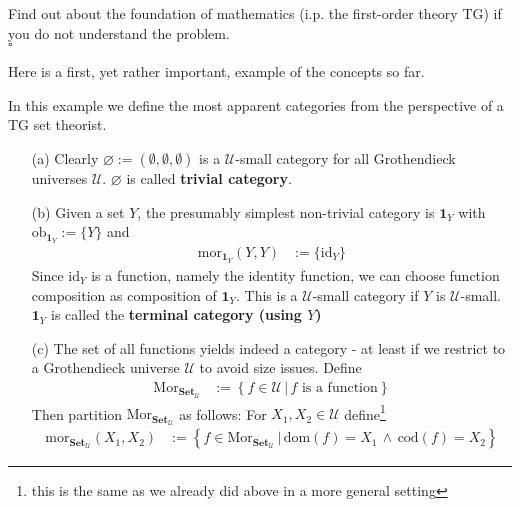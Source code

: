 \begin{prf}
Find out about the foundation of mathematics (i.p. the first-order theory TG) if you do not understand the problem.
\\
\phantom{proven}
\hfill
$\square$
\end{prf}
Here is a first, yet rather important, example of the concepts so far.
\\
\begin{exa}
\label{exa:basiccats1}
In this example we define the most apparent categories from the perspective of a TG set theorist.
\begin{enumerate}
\item[(a)]
Clearly $\mathbf{\varnothing} := (\emptyset,\emptyset,\emptyset)$ is a $\mathcal{U}$-small category for all Grothendieck universes $\mathcal{U}$. $\mathbf{\varnothing}$ is called \textbf{trivial category}.
\item[(b)]
Given a set $Y$, the presumably simplest non-trivial category is $\mathbf{1}_{Y}$ with $\mathrm{ob}_{\mathbf{1}_{Y}} := \lbrace Y \rbrace$ and
\begin{align*}
  \mathrm{mor}_{\mathbf{1}_{Y}}(Y,Y)
  &:=
  \lbrace
    \mathrm{id}_{Y}
  \rbrace
\end{align*}
Since $\mathrm{id}_{Y}$ is a function, namely the identity function, we can choose function composition as composition of $\mathbf{1}_{Y}$. This is a $\mathcal{U}$-small category if $Y$ is $\mathcal{U}$-small. $\mathbf{1}_{Y}$ is called the \textbf{terminal category (using $Y$)}
\item[(c)]
The set of all functions yields indeed a category - at least if we restrict to a Grothendieck universe $\mathcal{U}$ to avoid size issues. Define
\begin{align*}
  \mathrm{Mor}_{\mathbf{Set}_{\mathcal{U}}}
  &:=
  \left\lbrace
      f
      \in
      \mathcal{U}
    \,
    \vert
    \,
      f
      \text{ is a function}
  \right\rbrace
\end{align*}
Then partition $\mathrm{Mor}_{\mathbf{Set}_{\mathcal{U}}}$ as follows: For $X_{1},X_{2} \in \mathcal{U}$ define\footnote{this is the same as we already did above in a more general setting}
\begin{align*}
  \mathrm{mor}_{\mathbf{Set}_{\mathcal{U}}}(X_{1},X_{2})
  &:=
  \left\lbrace
      f
      \in
      \mathrm{Mor}_{\mathbf{Set}_{\mathcal{U}}}
    \,
    \vert
    \,
      \mathrm{dom}(f)
      =
      X_{1}
      \,
      \land
      \,
      \mathrm{cod}(f)
      =
      X_{2}
  \right\rbrace
\end{align*}

\end{enumerate}
\end{exa}
